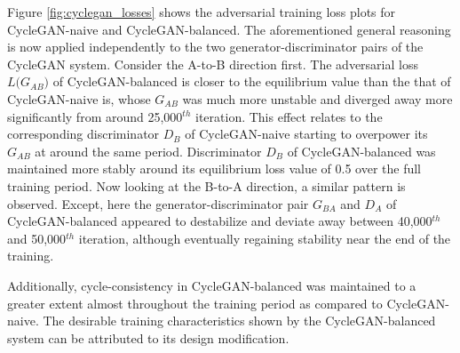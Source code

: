 Figure \ref{fig:cyclegan_losses} shows the adversarial training loss plots for CycleGAN-naive and CycleGAN-balanced. The aforementioned general reasoning is now applied independently to the two generator-discriminator pairs of the CycleGAN system. Consider the A-to-B direction first. The adversarial loss $L({G_{AB})}$ of CycleGAN-balanced is closer to the equilibrium value than the that of CycleGAN-naive is, whose $G_{AB}$ was much more unstable and diverged away more significantly from around 25,000$^{th}$ iteration. This effect relates to the corresponding discriminator $D_B$ of CycleGAN-naive starting to overpower its $G_{AB}$ at around the same period. Discriminator $D_B$ of CycleGAN-balanced was maintained more stably around its equilibrium loss value of 0.5 over the full training period. Now looking at the B-to-A direction, a similar pattern is observed. Except, here the generator-discriminator pair $G_{BA}$ and $D_A$ of CycleGAN-balanced appeared to destabilize and deviate away between 40,000$^{th}$ and 50,000$^{th}$ iteration, although eventually regaining stability near the end of the training. 

Additionally, cycle-consistency in CycleGAN-balanced was maintained to a greater extent almost throughout the training period as compared to CycleGAN-naive. The desirable training characteristics shown by the CycleGAN-balanced system can be attributed to its design modification.

